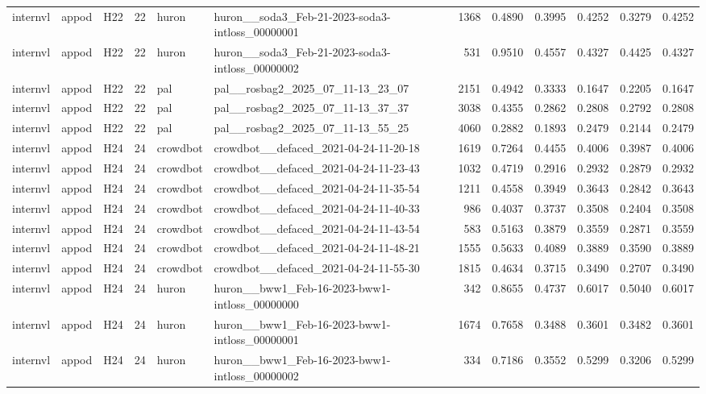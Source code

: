\begin{table}[tbp]
\begin{tabular}{lllrllrrrrrr}
internvl & appod & H22 & 22 & huron & huron\_\_soda3\_Feb-21-2023-soda3-intloss\_00000001 & 1368 & 0.4890 & 0.3995 & 0.4252 & 0.3279 & 0.4252 \\
internvl & appod & H22 & 22 & huron & huron\_\_soda3\_Feb-21-2023-soda3-intloss\_00000002 & 531 & 0.9510 & 0.4557 & 0.4327 & 0.4425 & 0.4327 \\
internvl & appod & H22 & 22 & pal & pal\_\_rosbag2\_2025\_07\_11-13\_23\_07 & 2151 & 0.4942 & 0.3333 & 0.1647 & 0.2205 & 0.1647 \\
internvl & appod & H22 & 22 & pal & pal\_\_rosbag2\_2025\_07\_11-13\_37\_37 & 3038 & 0.4355 & 0.2862 & 0.2808 & 0.2792 & 0.2808 \\
internvl & appod & H22 & 22 & pal & pal\_\_rosbag2\_2025\_07\_11-13\_55\_25 & 4060 & 0.2882 & 0.1893 & 0.2479 & 0.2144 & 0.2479 \\
internvl & appod & H24 & 24 & crowdbot & crowdbot\_\_defaced\_2021-04-24-11-20-18 & 1619 & 0.7264 & 0.4455 & 0.4006 & 0.3987 & 0.4006 \\
internvl & appod & H24 & 24 & crowdbot & crowdbot\_\_defaced\_2021-04-24-11-23-43 & 1032 & 0.4719 & 0.2916 & 0.2932 & 0.2879 & 0.2932 \\
internvl & appod & H24 & 24 & crowdbot & crowdbot\_\_defaced\_2021-04-24-11-35-54 & 1211 & 0.4558 & 0.3949 & 0.3643 & 0.2842 & 0.3643 \\
internvl & appod & H24 & 24 & crowdbot & crowdbot\_\_defaced\_2021-04-24-11-40-33 & 986 & 0.4037 & 0.3737 & 0.3508 & 0.2404 & 0.3508 \\
internvl & appod & H24 & 24 & crowdbot & crowdbot\_\_defaced\_2021-04-24-11-43-54 & 583 & 0.5163 & 0.3879 & 0.3559 & 0.2871 & 0.3559 \\
internvl & appod & H24 & 24 & crowdbot & crowdbot\_\_defaced\_2021-04-24-11-48-21 & 1555 & 0.5633 & 0.4089 & 0.3889 & 0.3590 & 0.3889 \\
internvl & appod & H24 & 24 & crowdbot & crowdbot\_\_defaced\_2021-04-24-11-55-30 & 1815 & 0.4634 & 0.3715 & 0.3490 & 0.2707 & 0.3490 \\
internvl & appod & H24 & 24 & huron & huron\_\_bww1\_Feb-16-2023-bww1-intloss\_00000000 & 342 & 0.8655 & 0.4737 & 0.6017 & 0.5040 & 0.6017 \\
internvl & appod & H24 & 24 & huron & huron\_\_bww1\_Feb-16-2023-bww1-intloss\_00000001 & 1674 & 0.7658 & 0.3488 & 0.3601 & 0.3482 & 0.3601 \\
internvl & appod & H24 & 24 & huron & huron\_\_bww1\_Feb-16-2023-bww1-intloss\_00000002 & 334 & 0.7186 & 0.3552 & 0.5299 & 0.3206 & 0.5299 \\

\end{tabular}
\end{table}
